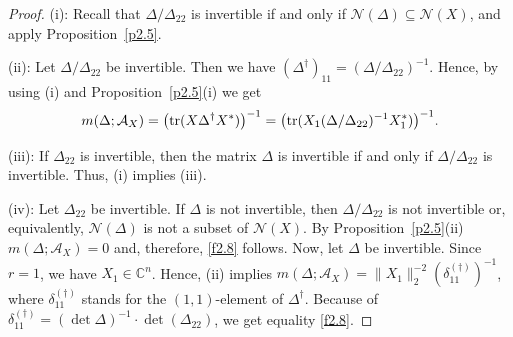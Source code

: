 \documentclass{amsart}
\begin{document}
\begin{proof}
(i): Recall that $\Delta/\Delta_{22}$ is invertible if and only if ${\mathcal N}(\Delta) \subseteq {\mathcal N}(X)$, and apply Proposition~\ref{p2.5}.

(ii): Let $\Delta/\Delta_{22}$ be invertible. Then we have $(\Delta^{\dagger})_{11} = (\Delta/\Delta_{22})^{-1}$. Hence, by using (i) and Proposition~\ref{p2.5}(i) we get
\[ 
    m(\Delta;{\mathcal A}_X) = \bigl({\rm tr}(X\Delta^{\dagger}X^*) \bigr)^{-1} = \bigl({\rm tr}(X_1 (\Delta/\Delta_{22})^{-1} X_1^*)     \bigr)^{-1} . 
\]

(iii): If $\Delta_{22}$ is invertible, then the matrix $\Delta$ is invertible if and only if
 $\Delta/\Delta_{22}$ is invertible. Thus, (i) implies (iii).

(iv): Let $\Delta_{22}$ be invertible. If $\Delta$ is not invertible, then $\Delta/\Delta_{22}$ is not invertible or, equivalently, ${\mathcal N}(\Delta)$ is not a subset of ${\mathcal N}(X)$. By Proposition~\ref{p2.5}(ii) $m(\Delta;{\mathcal A}_X)=0$ and, therefore, \eqref{f2.8} follows. Now, let $\Delta$ be invertible.  Since $r=1$, we have $X_1 \in {\mathbb C}^n$.  Hence, (ii) implies  $m(\Delta;{\mathcal A}_X) = \|X_1\|_2^{-2} (\delta_{11}^{(\dagger)})^{-1}$, where $\delta_{11}^{(\dagger)}$ stands for the $(1,1)$-element of $\Delta^\dagger$.  Because of $\delta_{11}^{(\dagger)} = (\det \Delta)^{-1} \cdot \det (\Delta_{22})$, we get equality \eqref{f2.8}.
\end{proof}
\end{document}
